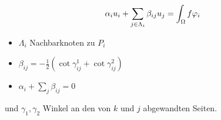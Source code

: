 \begin{align*}
  \alpha_i u_i + \sum_{j \in \Lambda_i}\beta_{ij}u_j = \int_\Omega f \varphi_i
\end{align*}
\begin{itemize}
\item $   \Lambda_i $ Nachbarknoten zu $P_i$
\item $\beta_{ij} = - \frac 1 2(\cot \gamma_{ij}^1 + \cot \gamma_{ij}^2)$
\item $\alpha_i + \sum_j \beta_{ij} = 0$ 
\end{itemize}
und $\gamma_1, \gamma_2$ Winkel an den von $k$ und $j$ abgewandten Seiten.

